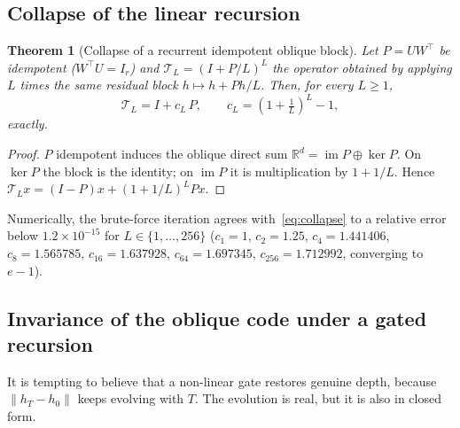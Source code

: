 \documentclass[11pt,a4paper]{article}
\theoremstyle{plain}
\newtheorem{theorem}{Theorem}
\theoremstyle{definition}
\theoremstyle{remark}
\newcommand{\R}{\mathbb R}
\newcommand{\im}{\operatorname{im}}
\newcommand{\T}{\top}
\begin{document}
\subsection{Collapse of the linear recursion}
\begin{theorem}[Collapse of a recurrent idempotent oblique block]
\label{thm:collapse}
Let $P=UW^\T$ be idempotent ($W^\T U=I_r$) and
$\mathcal T_L=(I+P/L)^L$ the operator obtained by applying $L$ times the
\emph{same} residual block $h\mapsto h+Ph/L$. Then, for every $L\ge1$,
\begin{equation}
  \mathcal T_L=I+c_L\,P,\qquad c_L=(1+\tfrac1L)^L-1,
  \label{eq:collapse}
\end{equation}
exactly.
\end{theorem}
\begin{proof}
$P$ idempotent induces the oblique direct sum $\R^d=\im P\oplus\ker P$. On
$\ker P$ the block is the identity; on $\im P$ it is multiplication by
$1+1/L$. Hence $\mathcal T_Lx=(I-P)x+(1+1/L)^LPx$.
\end{proof}
Numerically, the brute-force iteration agrees with~\eqref{eq:collapse} to a
relative error below $1.2\times10^{-15}$ for $L\in\{1,\dots,256\}$
($c_1=1$, $c_2=1.25$, $c_4=1.441406$, $c_8=1.565785$, $c_{16}=1.637928$,
$c_{64}=1.697345$, $c_{256}=1.712992$, converging to $e-1$).

\subsection{Invariance of the oblique code under a gated recursion}
It is tempting to believe that a non-linear gate restores genuine depth,
because $\|h_T-h_0\|$ keeps evolving with $T$. The evolution is real, but it
is also in closed form.
\end{document}
